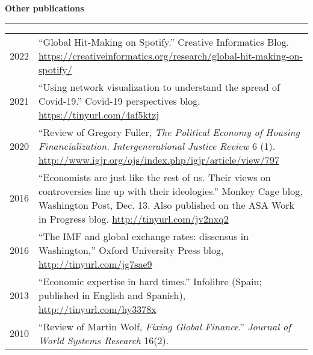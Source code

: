 \documentclass[12pt,letterpaper]{article}
\newcommand{\sectionhead}[1]{\begin{flushleft}\large\bf{#1}\vspace{.1cm}\hrule\end{flushleft}}
\begin{document}
\sectionhead{Other publications}
\begin{tabulary}{.97\textwidth}{@{}p{2.5cm}  L}
	
2022 & ``Global Hit-Making on Spotify.''  Creative Informatics Blog. \url{https://creativeinformatics.org/research/global-hit-making-on-spotify/} \\
	
2021 & ``Using network visualization to understand the spread of Covid-19.''  Covid-19 perspectives blog.  \url{https://tinyurl.com/4af5ktzj}\vspace{0.2cm} \\	
	
2020 & ``Review of Gregory Fuller, \emph{The Political Economy of Housing Financialization.}  \emph{Intergenerational Justice Review}	6 (1).  \url{http://www.igjr.org/ojs/index.php/igjr/article/view/797}\vspace{0.2cm}\\

2016 & ``Economists are just like the rest of us.  Their views on controversies line up with their ideologies.''  Monkey Cage blog, Washington Post, Dec. 13. Also published on the ASA Work in Progress blog. \url{http://tinyurl.com/jv2nxq2}\vspace{0.2cm}\\

2016 & ``The IMF and global exchange rates: dissensus in Washington,'' Oxford University Press blog, \url{http://tinyurl.com/jg7sae9}\vspace{0.2cm}\\

2013 & ``Economic expertise in hard times.''  Infolibre (Spain; published in English and Spanish), \url{http://tinyurl.com/hy3378x}\vspace{0.2cm}\\

2010 & ``Review of Martin Wolf, \emph{Fixing Global Finance}.'' \emph{Journal of World Systems Research} 16(2).\vspace{0.2cm}\\
\end{tabulary}
\end{document}
